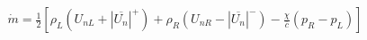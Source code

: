 \documentclass[10pt]{article}
\begin{document}
\begin{align*}\dot{m}
=
\frac{1}{2} \left[ \rho_{L} \left( U_{nL}+ | \overline{ U_{n}} |^{+} \right) + \rho_{R} \left( U_{nR} - | \overline{U_{n}} |^{-} \right) - \frac{\chi}{\overline{c} }  \left( p_{R}- p_{L} \right) \right]\end{align*}
\end{document}
